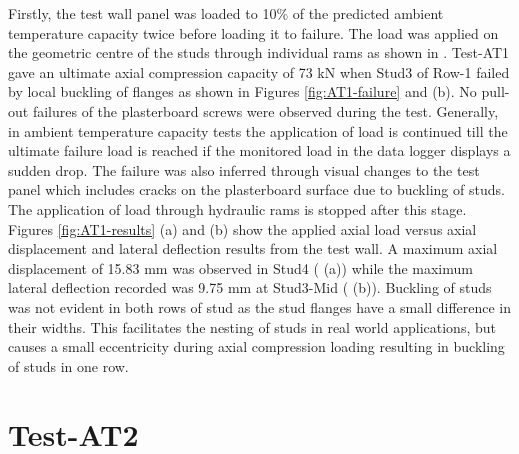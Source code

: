 Firstly, the test wall panel was loaded to 10\% of the predicted ambient temperature capacity twice before loading it to failure. The load was applied on the geometric centre of the studs through individual rams as shown in . Test-AT1 gave an ultimate axial compression capacity of 73 kN when Stud3 of Row-1 failed by local buckling of flanges as shown in Figures \ref{fig:AT1-failure}  and (b). No pull-out failures of the plasterboard screws were observed during the test. Generally, in ambient temperature capacity tests the application of load is continued till the ultimate failure load is reached if the monitored load in the data logger displays a sudden drop. The failure was also inferred through visual changes to the test panel which includes cracks on the plasterboard surface due to buckling of studs. The application of load through hydraulic rams is stopped after this stage. Figures \ref{fig:AT1-results} (a) and (b) show the applied axial load versus axial displacement and lateral deflection results from the test wall. A maximum axial displacement of 15.83 mm was observed in Stud4 ( (a)) while the maximum lateral deflection recorded was 9.75 mm at Stud3-Mid ( (b)). Buckling of studs was not evident in both rows of stud as the stud flanges have a small difference in their widths. This facilitates the nesting of studs in real world applications, but causes a small eccentricity during axial compression loading resulting in buckling of studs in one row. 

\section{Test-AT2}

